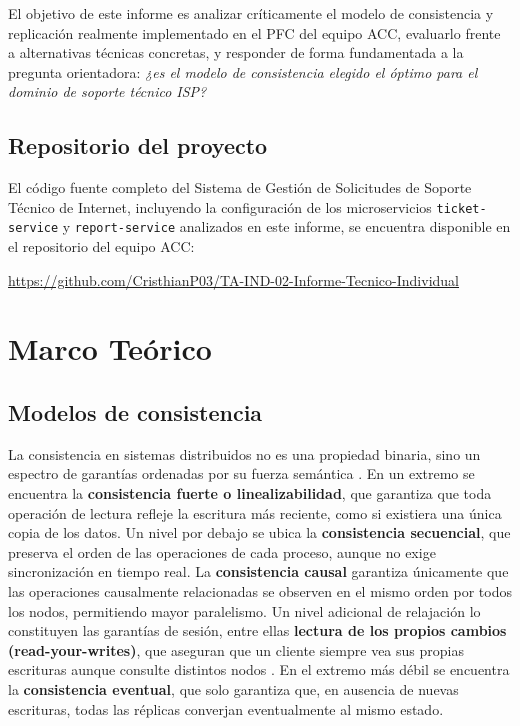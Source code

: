 \documentclass[12pt, a4paper]{article}
\begin{document}
El objetivo de este informe es analizar críticamente el modelo de consistencia y replicación realmente implementado en el PFC del equipo ACC, evaluarlo frente a alternativas técnicas concretas, y responder de forma fundamentada a la pregunta orientadora: \textit{¿es el modelo de consistencia elegido el óptimo para el dominio de soporte técnico ISP?}
\newpage
\subsection{Repositorio del proyecto}
El código fuente completo del Sistema de Gestión de Solicitudes de Soporte Técnico de Internet, incluyendo la configuración de los microservicios \texttt{ticket-service} y \texttt{report-service} analizados en este informe, se encuentra disponible en el repositorio del equipo ACC:
\begin{center}
\url{https://github.com/CristhianP03/TA-IND-02-Informe-Tecnico-Individual}
\end{center}
\section{Marco Teórico}

\subsection{Modelos de consistencia}
La consistencia en sistemas distribuidos no es una propiedad binaria, sino un espectro de garantías ordenadas por su fuerza semántica \cite{viottivukolic2016}. En un extremo se encuentra la \textbf{consistencia fuerte o linealizabilidad}, que garantiza que toda operación de lectura refleje la escritura más reciente, como si existiera una única copia de los datos. Un nivel por debajo se ubica la \textbf{consistencia secuencial}, que preserva el orden de las operaciones de cada proceso, aunque no exige sincronización en tiempo real. La \textbf{consistencia causal} garantiza únicamente que las operaciones causalmente relacionadas se observen en el mismo orden por todos los nodos, permitiendo mayor paralelismo. Un nivel adicional de relajación lo constituyen las garantías de sesión, entre ellas \textbf{lectura de los propios cambios (read-your-writes)}, que aseguran que un cliente siempre vea sus propias escrituras aunque consulte distintos nodos \cite{terry1994}. En el extremo más débil se encuentra la \textbf{consistencia eventual}, que solo garantiza que, en ausencia de nuevas escrituras, todas las réplicas converjan eventualmente al mismo estado.
\end{document}

